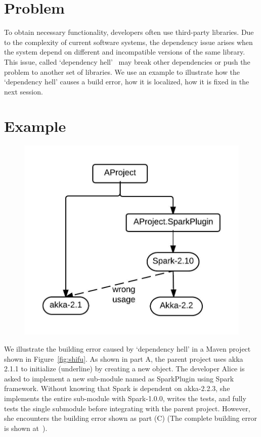 
\section{Problem}  
To obtain necessary functionality, developers often use third-party libraries. Due to the complexity of current software systems, the dependency issue arises when the system depend on different and incompatible versions of the same library. This issue, called  `dependency hell'~\cite{wiki:hell} may break other dependencies or push the problem to another set of libraries.  We use an example to illustrate how the `dependency hell' causes a build error, how it is localized, how it is fixed in the next session.


\section{Example}


 \begin{figure}[!htb]
 \includegraphics{akka.jpeg}
 \end{figure}



We illustrate the building error caused by `dependency hell' in a Maven project shown in Figure~\ref{fig:shifu}. As shown in part A, the parent project uses akka 2.1.1 to initialize  (underline) by creating a new  object. The developer Alice is asked to implement a new sub-module named as SparkPlugin using Spark framework. Without knowing that Spark is dependent on akka-2.2.3, she implements the entire sub-module with Spark-1.0.0, writes the tests, and fully tests the single submodule before integrating with the parent project. However, she encounters the building error shown as part (C) (The complete building error is shown at~\cite{shifu}). 

